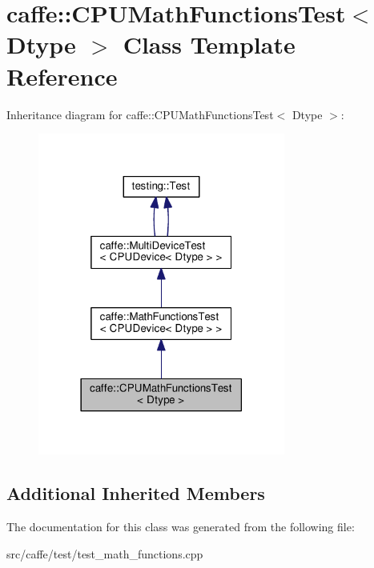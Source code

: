 \hypertarget{classcaffe_1_1_c_p_u_math_functions_test}{}\section{caffe\+:\+:C\+P\+U\+Math\+Functions\+Test$<$ Dtype $>$ Class Template Reference}
\label{classcaffe_1_1_c_p_u_math_functions_test}


Inheritance diagram for caffe\+:\+:C\+P\+U\+Math\+Functions\+Test$<$ Dtype $>$\+:
\nopagebreak
\begin{figure}[H]
\begin{center}
\leavevmode
\includegraphics[width=230pt]{classcaffe_1_1_c_p_u_math_functions_test__inherit__graph}
\end{center}
\end{figure}
\subsection*{Additional Inherited Members}


The documentation for this class was generated from the following file\+:\begin{DoxyCompactItemize}
\item 
src/caffe/test/test\+\_\+math\+\_\+functions.\+cpp\end{DoxyCompactItemize}
